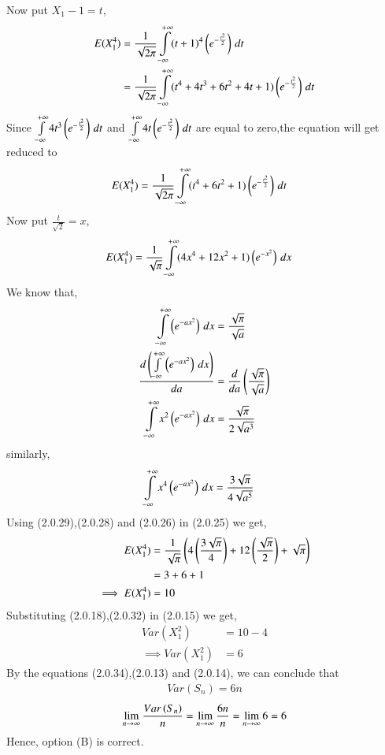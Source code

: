 \documentclass[journal,12pt,twocolumn]{IEEEtran}
\begin{document}
Now put $X_{1}-1=t$,
\begin{align}
    E(X_{1}^4)&=\frac{1}{\sqrt{2\pi}}\int\limits_{-\infty}^{+\infty}(t+1)^{4}\left(e^{-\frac{t^{2}}{2}}\right)\,dt
\\ &=\frac{1}{\sqrt{2\pi}}\int\limits_{-\infty}^{+\infty}(t^{4}+4t^{3}+6t^{2}+4t+1)\left(e^{-\frac{t^{2}}{2}}\right)\,dt
\end{align}
Since $\int\limits_{-\infty}^{+\infty}4t^3\left(e^{-\frac{t^{2}}{2}}\right)\,dt$ and $\int\limits_{-\infty}^{+\infty}4t\left(e^{-\frac{t^{2}}{2}}\right)\,dt$ are equal to zero,the equation will get reduced to
\begin{align}
    E(X_{1}^4)&=\frac{1}{\sqrt{2\pi}}\int\limits_{-\infty}^{+\infty}(t^{4}+6t^{2}+1)\left(e^{-\frac{t^{2}}{2}}\right)\,dt
\end{align}
Now put $\frac{t}{\sqrt{2}}=x$,
\begin{align}
    E(X_{1}^4)&=\frac{1}{\sqrt{\pi}}\int\limits_{-\infty}^{+\infty}(4x^{4}+12x^{2}+1)\left(e^{-x^{2}}\right)\,dx
\end{align}
We know that,
\begin{align}
\int\limits_{-\infty}^{+\infty}\left(e^{-ax^{2}}\right)\,dx&=\frac{\sqrt{\pi}}{\sqrt{a}}
\\\frac{d\left(\int\limits_{-\infty}^{+\infty}\left(e^{-ax^{2}}\right)\,dx\right)}{da}&=\frac{d}{da}\left(\frac{\sqrt{\pi}}{\sqrt{a}}\right)
\\\int\limits_{-\infty}^{+\infty}x^{2}\left(e^{-ax^{2}}\right)\,dx&=\frac{\sqrt{\pi}}{2\sqrt{a^3}}
\end{align}
similarly,
\begin{align}
    \int\limits_{-\infty}^{+\infty}x^{4}\left(e^{-ax^{2}}\right)\,dx&=\frac{3\sqrt{\pi}}{4\sqrt{a^5}}
\end{align}
Using (2.0.29),(2.0.28) and (2.0.26) in (2.0.25) we get,
\begin{align}
     E(X_{1}^4)&=\frac{1}{\sqrt{\pi}}\left(4\left(\frac{3\sqrt{\pi}}{4}\right)+12\left(\frac{\sqrt{\pi}}{2}\right)+\sqrt{\pi}\right)
     \\&=3+6+1
    \\\implies  E(X_{1}^4)&=10
\end{align}
Substituting (2.0.18),(2.0.32) in (2.0.15) we get,
\begin{align}
    Var(X_{1}^{2})&=10-4
    \\\implies Var(X_{1}^{2})&=6
\end{align}
By the equations (2.0.34),(2.0.13) and (2.0.14), we can conclude that 
\begin{align}
    Var(S_{n})=6n
\end{align}
$$\lim_{n \to \infty}{\frac{Var\left(S_{n}\right)}{n}}=\lim_{n \to \infty}{\frac{6n}{n}}=\lim_{n \to \infty}{6}=6$$
Hence, option (B) is correct.
\end{document}
